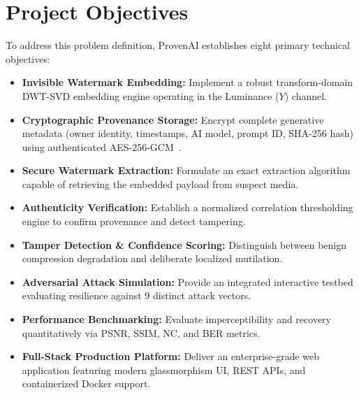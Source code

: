 \documentclass[12pt,a4paper]{report}
\begin{document}
\section{Project Objectives}
To address this problem definition, ProvenAI establishes eight primary technical objectives:
\begin{itemize}
    \item \textbf{Invisible Watermark Embedding:} Implement a robust transform-domain DWT-SVD embedding engine operating in the Luminance ($Y$) channel.
    \item \textbf{Cryptographic Provenance Storage:} Encrypt complete generative metadata (owner identity, timestamps, AI model, prompt ID, SHA-256 hash) using authenticated AES-256-GCM~\cite{dworkin2007sp800}.
    \item \textbf{Secure Watermark Extraction:} Formulate an exact extraction algorithm capable of retrieving the embedded payload from suspect media.
    \item \textbf{Authenticity Verification:} Establish a normalized correlation thresholding engine to confirm provenance and detect tampering.
    \item \textbf{Tamper Detection \& Confidence Scoring:} Distinguish between benign compression degradation and deliberate localized mutilation.
    \item \textbf{Adversarial Attack Simulation:} Provide an integrated interactive testbed evaluating resilience against 9 distinct attack vectors.
    \item \textbf{Performance Benchmarking:} Evaluate imperceptibility and recovery quantitatively via PSNR, SSIM, NC, and BER metrics.
    \item \textbf{Full-Stack Production Platform:} Deliver an enterprise-grade web application featuring modern glassmorphism UI, REST APIs, and containerized Docker support.
\end{itemize}
\end{document}
